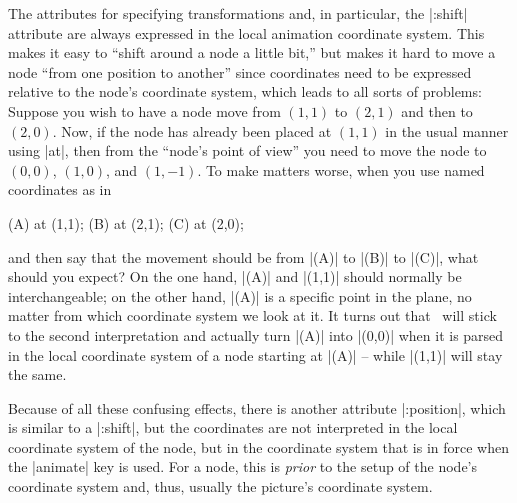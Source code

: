 The attributes for specifying transformations and, in particular, the
|:shift| attribute are always expressed in the local animation
coordinate system. This makes it easy to ``shift around a node a
little bit,'' but makes it hard to move a node ``from one position to
another'' since coordinates need to be expressed relative to the node's
coordinate system, which leads to all sorts of problems: Suppose you
wish to have a node move from $(1,1)$ to $(2,1)$ and then to
$(2,0)$. Now, if the node has already been placed at $(1,1)$ in the
usual manner using |at|, then from the ``node's point of view'' you
need to move the node to $(0,0)$, $(1,0)$, and $(1,-1)$. To make
matters worse, when you use named coordinates as in
\begin{codeexample}
\coordinate(A) at (1,1);
\coordinate(B) at (2,1);
\coordinate(C) at (2,0);
\end{codeexample}
and then say that the movement should be from |(A)| to |(B)| to |(C)|,
what should you expect? On the one hand, |(A)| and |(1,1)| should
normally be interchangeable; on the other hand, |(A)| is a specific
point in the plane, no matter from which coordinate system we look at
it. It turns out that \tikzname\ will stick to the second
interpretation and actually turn |(A)| into |(0,0)| when it is parsed
in the local coordinate system of a node starting at |(A)| -- while
|(1,1)| will stay the same.

Because of all these confusing effects, there is another attribute
|:position|, which is similar to a |:shift|, but the coordinates are
not interpreted in the local coordinate system of the node, but in the
coordinate system that is in force when the |animate| key is used. For
a node, this is \emph{prior} to the setup of the node's coordinate
system and, thus, usually the picture's coordinate system.  

